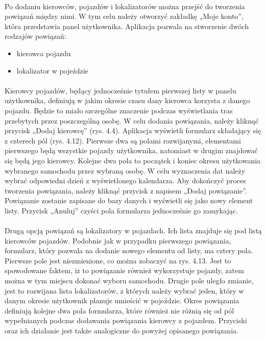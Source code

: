 \paragraph{}
Po dodaniu kierowców, pojazdów i lokalizatorów można przejść do tworzenia powiązań między nimi. W tym celu należy otworzyć zakładkę „Moje konto”, która przedstawia panel użytkownika. Aplikacja pozwala na stworzenie dwóch rodzajów powiązań:

\begin{itemize}
	\item kierowca pojazdu
	\item lokalizator w pojeździe
\end{itemize}

\paragraph{}
Kierowcy pojazdów, będący jednocześnie tytułem pierwszej listy w panelu użytkownika, definiują w jakim okresie czasu dany kierowca korzysta z danego pojazdu. Będzie to miało szczególne znaczenie podczas wyświetlania tras przebytych przez poszczególną osobę. W celu dodania powiązania, należy kliknąć przycisk „Dodaj kierowcę” (rys. 4.4). Aplikacja wyświetli formularz składający się z czterech pól (rys. 4.12). Pierwsze dwa są polami rozwijanymi, elementami pierwszego będą wszystkie pojazdy użytkownika, natomiast w drugim znajdować się będą jego kierowcy. Kolejne dwa pola to początek i koniec okresu użytkowania wybranego samochodu przez wybraną osobę. W celu wyznaczenia dat należy wybrać odpowiedni dzień z wyświetlonego kalendarza. Aby dokończyć proces tworzenia powiązania, należy kliknąć przycisk z napisem „Dodaj powiązanie”. Powiązanie zostanie zapisane do bazy danych i wyświetli się jako nowy element listy. Przycisk „Anuluj” czyści pola formularza jednocześnie go zamykając.

\paragraph{}
Drugą opcją powiązań są lokalizatory w pojazdach. Ich lista znajduje się pod listą kierowców pojazdów. Podobnie jak w przypadku pierwszego powiązania, formularz, który pozwala na dodanie nowego elementu od listy, ma cztery pola. Pierwsze pole jest niezmienione, co można zobaczyć na rys. 4.13. Jest to spowodowane faktem, iż to powiązanie również wykorzystuje pojazdy, zatem można w tym miejscu dokonać wyboru samochodu. Drugie pole uległo zmianie, jest to rozwijana lista lokalizatorów, z których należy wybrać jeden, który w danym okresie użytkownik planuje umieścić w pojeździe. Okres powiązania definiują kolejne dwa pola formularza, które również nie różnią się od pól wypełnianych podczas dodawania powiązania kierowcy z pojazdem. Przyciski oraz ich działanie jest także analogiczne do powyżej opisanego powiązania.

